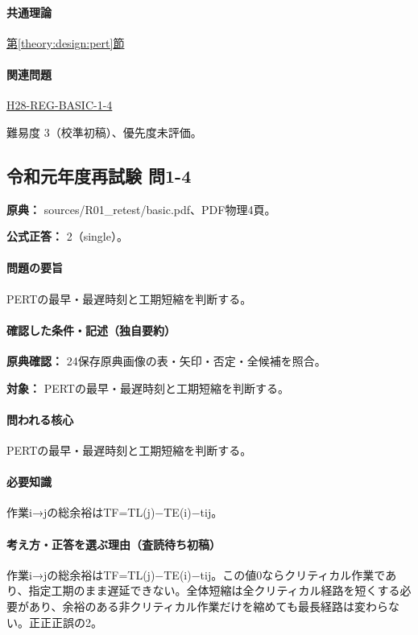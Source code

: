 \paragraph{共通理論} \hyperref[theory:design:pert]{第\ref*{theory:design:pert}節}

\paragraph{関連問題} \hyperref[q:h28-reg-basic-1-4]{H28-REG-BASIC-1-4}

\par 難易度 3（校準初稿）、優先度未評価。

\subsection{令和元年度再試験 問1-4}
\label{q:r01-ret-basic-1-4}

\noindent\textbf{原典：} sources/R01\_retest/basic.pdf、PDF物理4頁。

\textbf{公式正答：} 2（single）。

\paragraph{問題の要旨} PERTの最早・最遅時刻と工期短縮を判断する。

\paragraph{確認した条件・記述（独自要約）}\mbox{}\par

\noindent\textbf{原典確認：} 24保存原典画像の表・矢印・否定・全候補を照合。\par

\noindent\textbf{対象：} PERTの最早・最遅時刻と工期短縮を判断する。\par

\paragraph{問われる核心} PERTの最早・最遅時刻と工期短縮を判断する。

\paragraph{必要知識} 作業i→jの総余裕はTF=\allowbreak{}TL(j)−TE(i)−tij。

\paragraph{考え方・正答を選ぶ理由（査読待ち初稿）} 作業i→jの総余裕はTF=\allowbreak{}TL(j)−TE(i)−tij。この値0ならクリティカル作業であり、指定工期のまま遅延できない。全体短縮は全クリティカル経路を短くする必要があり、余裕のある非クリティカル作業だけを縮めても最長経路は変わらない。正正正誤の2。

